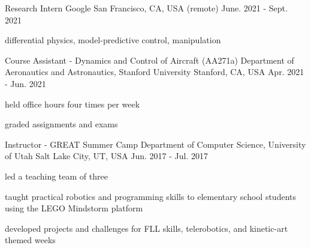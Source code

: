 

\begin{cventries}
	
\cventry
{Research Intern} %
{Google} %
{San Francisco, CA, USA (remote)} %
{June. 2021 - Sept. 2021} %
{
	\begin{cvitems} %
		\item{differential physics, model-predictive control, manipulation}
	\end{cvitems}
}
	
\cventry
{Course Assistant - Dynamics and Control of Aircraft (AA271a)} %
{Department of Aeronautics and Astronautics, Stanford University} %
{Stanford, CA, USA} %
{Apr. 2021 - Jun. 2021} %
{
	\begin{cvitems} %
		\item{held office hours four times per week}
		\item{graded assignments and exams}
	\end{cvitems}
}

  \cventry
    {Instructor - GREAT Summer Camp} %
    {Department of Computer Science, University of Utah} %
    {Salt Lake City, UT, USA} %
    {Jun. 2017 - Jul. 2017} %
    {
      \begin{cvitems} %
        \item {led a teaching team of three}
        \item{taught practical robotics and programming skills to elementary school students using the LEGO Mindstorm platform}
        \item {developed projects and challenges for FLL skills, telerobotics, and kinetic-art themed weeks}
      \end{cvitems}
    }


\end{cventries}
